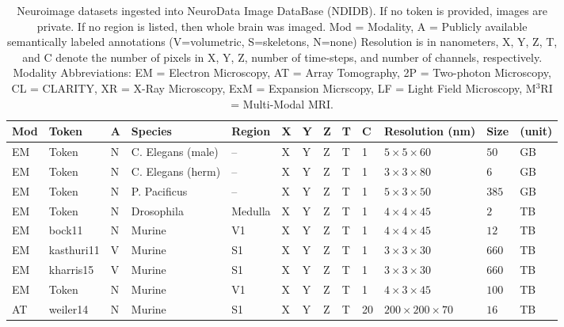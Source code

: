 \documentclass[12pt]{article}
\begin{document}
\begin{table}[h!]
\begin{center}
\caption{Neuroimage datasets ingested into NeuroData Image DataBase (NDIDB). 
If no token is provided, images are private.
If no region is listed, then whole brain was imaged.  
Mod = Modality, A = Publicly available semantically labeled annotations (V=volumetric, S=skeletons, N=none)
Resolution is in nanometers, X, Y, Z, T, and C denote the number of pixels in X, Y, Z, number of time-steps, and number of channels, respectively.  
Modality Abbreviations: 
EM = Electron Microscopy,
AT = Array Tomography,
2P = Two-photon Microscopy,
CL = CLARITY,
XR = X-Ray Microscopy,
ExM = Expansion Micrscopy,
LF = Light Field Microscopy,
M$^3$RI = Multi-Modal MRI.} 	
\label{tab:projects}

\begin{tabular}{|l|l|l|l|l|l|l|l|l|l|l|l l|}
\hline Mod & Token 		& A & Species 			& Region 	& X & Y & Z & T & C  & Resolution (nm)				& Size & (unit)
\\ \hline 
\hline EM & Token 		& N & C. Elegans (male) & -- 		& X & Y & Z & T & 1  & $5 \times 5 \times 60$ 		& $50$ 	& GB  \\ %
\hline EM & Token 		& N & C. Elegans (herm)	& -- 		& X & Y & Z & T & 1  & $3 \times 3 \times 80$  		& $6$  	& GB    \\ %
\hline EM & Token 		& N & P. Pacificus 		& -- 		& X & Y & Z & T & 1  & $5 \times 3 \times 50$ 		& $385$ & GB   \\ %
\hline EM & Token 		& N & Drosophila 		& Medulla	& X & Y & Z & T & 1  & $4 \times 4 \times 45$  		& $2$ 	& TB    \\ %
\hline EM & bock11 		& N & Murine 			& V1 		& X & Y & Z & T & 1  & $4 \times 4 \times 45$ 		& $12$ 	& TB    \\ %
\hline EM & kasthuri11 	& V & Murine 			& S1  		& X & Y & Z & T & 1  & $3 \times 3 \times 30$  		& $660$ & TB \\ %
\hline EM & kharris15 	& V & Murine 			& S1  		& X & Y & Z & T & 1  & $3 \times 3 \times 30$  		& $660$ & TB \\ %
\hline EM & Token 		& N & Murine 			& V1 		& X & Y & Z & T & 1  & $4 \times 3 \times 45$		& $100$ & TB  \\
\hline AT & weiler14  	& N & Murine 			& S1 		& X & Y & Z & T & 20 & $200 \times 200 \times 70$ 	& $16$  & TB  \\ %

\end{tabular}
\end{center}
\end{table}
\end{document}
